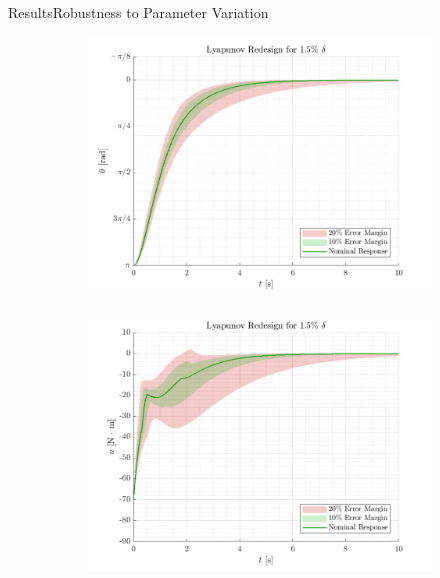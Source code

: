 \begin{frame}{Results}{Robustness to Parameter Variation}
\begin{figure}[H]
  \begin{minipage}{0.45\linewidth}
    \begin{figure}[H]
      \centering
      \includegraphics[width=\linewidth]{figures/lyapunovRedesign2}
    \end{figure}        
  \end{minipage}\hfill      
  \begin{minipage}{0.45\linewidth}
    \begin{figure}[H]
      \centering
      \includegraphics[width=1\linewidth]{figures/lyapunovRedesign2_u}
    \end{figure}                
  \end{minipage}\hfill \\
\end{figure}
\end{frame}


